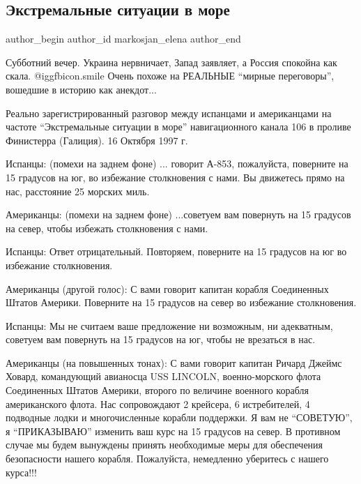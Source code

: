  
 
 
 
 
 
\subsection{Экстремальные ситуации в море}
\label{sec:22_01_2022.fb.markosjan_elena.1.ekstremalnyje_situacii_v_more}
 
\ifcmt
 author_begin
   author_id markosjan_elena
 author_end
\fi

Субботний вечер. Украина нервничает, Запад заявляет, а Россия спокойна как
скала.  @igg{fbicon.smile}  Очень похоже на РЕАЛЬНЫЕ \enquote{мирные переговоры}, вошедшие в историю как
анекдот...

Реально зарегистрированный разговор между испанцами и американцами на частоте
\enquote{Экстремальные ситуации в море} навигационного канала 106 в проливе Финистерра
(Галиция). 16 Октября 1997 г.

Испанцы: (помехи на заднем фоне) ... говорит А-853, пожалуйста, поверните на 15
градусов на юг, во избежание столкновения с нами. Вы движетесь прямо на нас,
расстояние 25 морских миль.

Американцы: (помехи на заднем фоне) ...советуем вам повернуть на 15 градусов на
север, чтобы избежать столкновения с нами.

Испанцы: Ответ отрицательный. Повторяем, поверните на 15 градусов на юг во
избежание столкновения.

Американцы (другой голос): С вами говорит капитан корабля Соединенных Штатов
Америки. Поверните на 15 градусов на север во избежание столкновения.

Испанцы: Мы не считаем ваше предложение ни возможным, ни адекватным, советуем
вам повернуть на 15 градусов на юг, чтобы не врезаться в нас.

Американцы (на повышенных тонах): С вами говорит капитан Ричард Джеймс Ховард,
командующий авианосца USS LINCOLN, военно-морского флота Соединенных Штатов
Америки, второго по величине военного корабля американского флота. Нас
сопровождают 2 крейсера, 6 истребителей, 4 подводные лодки и многочисленные
корабли поддержки. Я вам не \enquote{СОВЕТУЮ}, я \enquote{ПРИКАЗЫВАЮ} изменить ваш курс на 15
градусов на север. В противном случае мы будем вынуждены принять необходимые
меры для обеспечения безопасности нашего корабля. Пожалуйста, немедленно
уберитесь с нашего курса!!! 

